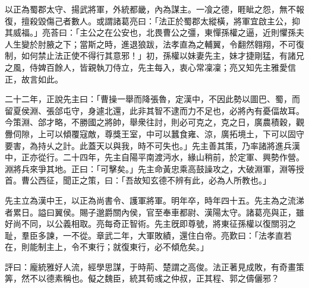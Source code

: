 \begin{pinyinscope}
 
以正為蜀郡太守、揚武將軍，外統都畿，內為謀主。一飡之德，睚眦之怨，無不報復，擅殺毀傷己者數人。或謂諸葛亮曰：「法正於蜀郡太縱橫，將軍宜啟主公，抑其威福。」亮荅曰：「主公之在公安也，北畏曹公之彊，東憚孫權之逼，近則懼孫夫人生變於肘腋之下；當斯之時，進退狼跋，法孝直為之輔翼，令翻然翱翔，不可復制，如何禁止法正使不得行其意邪！」初，孫權以妹妻先主，妹才捷剛猛，有諸兄之風，侍婢百餘人，皆親執刀侍立，先主每入，衷心常凜凜；亮又知先主雅愛信正，故言如此。
 
 
二十二年，正說先主曰：「曹操一舉而降張魯，定漢中，不因此勢以圖巴、蜀，而留夏侯淵、張郃屯守，身遽北還，此非其智不逮而力不足也，必將內有憂偪故耳。今策淵、郃才略，不勝國之將帥，舉衆往討，則必可克之，克之日，廣農積穀，觀釁伺隙，上可以傾覆寇敵，尊獎王室，中可以蠶食雍、涼，廣拓境土，下可以固守要害，為持乆之計。此蓋天以與我，時不可失也。」先主善其策，乃率諸將進兵漢中，正亦從行。二十四年，先主自陽平南渡沔水，緣山稍前，於定軍、興勢作營。淵將兵來爭其地。正曰：「可擊矣。」先主命黃忠乘高鼓譟攻之，大破淵軍，淵等授首。曹公西征，聞正之策，曰：「吾故知玄德不辨有此，必為人所教也。」
 
 
先主立為漢中王，以正為尚書令、護軍將軍。明年卒，時年四十五。先主為之流涕者累日。謚曰翼侯。賜子邈爵關內侯，官至奉車都尉、漢陽太守。諸葛亮與正，雖好尚不同，以公義相取。亮每奇正智術。先主旣即尊號，將東征孫權以復關羽之耻，羣臣多諫，一不從。章武二年，大軍敗績，還住白帝。亮歎曰：「法孝直若在，則能制主上，令不東行；就復東行，必不傾危矣。」
 
 
 
 
 評曰：龐統雅好人流，經學思謀，于時荊、楚謂之高俊。法正著見成敗，有奇畫策筭，然不以德素稱也。儗之魏臣，統其荀彧之仲叔，正其程、郭之儔儷邪？
 
 
\end{pinyinscope}